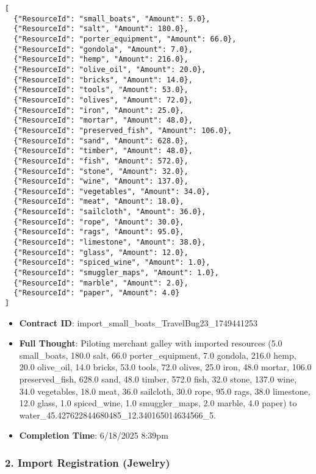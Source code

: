 \documentclass[11pt,a4paper]{article}
\begin{document}
\begin{lstlisting}
[
  {"ResourceId": "small_boats", "Amount": 5.0},
  {"ResourceId": "salt", "Amount": 180.0},
  {"ResourceId": "porter_equipment", "Amount": 66.0},
  {"ResourceId": "gondola", "Amount": 7.0},
  {"ResourceId": "hemp", "Amount": 216.0},
  {"ResourceId": "olive_oil", "Amount": 20.0},
  {"ResourceId": "bricks", "Amount": 14.0},
  {"ResourceId": "tools", "Amount": 53.0},
  {"ResourceId": "olives", "Amount": 72.0},
  {"ResourceId": "iron", "Amount": 25.0},
  {"ResourceId": "mortar", "Amount": 48.0},
  {"ResourceId": "preserved_fish", "Amount": 106.0},
  {"ResourceId": "sand", "Amount": 628.0},
  {"ResourceId": "timber", "Amount": 48.0},
  {"ResourceId": "fish", "Amount": 572.0},
  {"ResourceId": "stone", "Amount": 32.0},
  {"ResourceId": "wine", "Amount": 137.0},
  {"ResourceId": "vegetables", "Amount": 34.0},
  {"ResourceId": "meat", "Amount": 18.0},
  {"ResourceId": "sailcloth", "Amount": 36.0},
  {"ResourceId": "rope", "Amount": 30.0},
  {"ResourceId": "rags", "Amount": 95.0},
  {"ResourceId": "limestone", "Amount": 38.0},
  {"ResourceId": "glass", "Amount": 12.0},
  {"ResourceId": "spiced_wine", "Amount": 1.0},
  {"ResourceId": "smuggler_maps", "Amount": 1.0},
  {"ResourceId": "marble", "Amount": 2.0},
  {"ResourceId": "paper", "Amount": 4.0}
]
\end{lstlisting}

\begin{itemize}
\item \textbf{Contract ID}: import\_small\_boats\_TravelBug23\_1749441253
\item \textbf{Full Thought}: Piloting merchant galley with imported resources (5.0 small\_boats, 180.0 salt, 66.0 porter\_equipment, 7.0 gondola, 216.0 hemp, 20.0 olive\_oil, 14.0 bricks, 53.0 tools, 72.0 olives, 25.0 iron, 48.0 mortar, 106.0 preserved\_fish, 628.0 sand, 48.0 timber, 572.0 fish, 32.0 stone, 137.0 wine, 34.0 vegetables, 18.0 meat, 36.0 sailcloth, 30.0 rope, 95.0 rags, 38.0 limestone, 12.0 glass, 1.0 spiced\_wine, 1.0 smuggler\_maps, 2.0 marble, 4.0 paper) to water\_45.427622844680485\_12.340165014634566\_5.
\item \textbf{Completion Time}: 6/18/2025 8:39pm
\end{itemize}

\subsubsection{2. Import Registration (Jewelry)}
\end{document}
